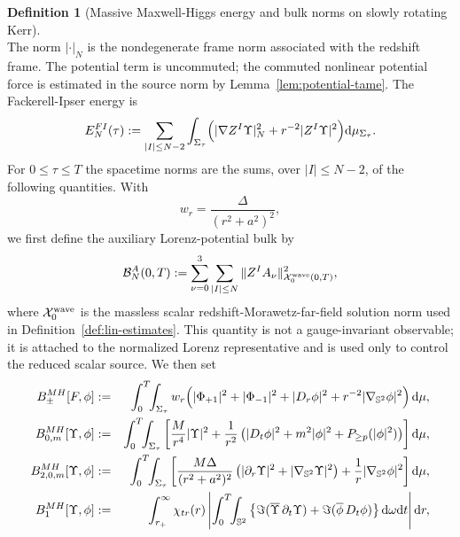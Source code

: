 \documentclass[11pt]{article}
\numberwithin{equation}{section}
\theoremstyle{plain}
\theoremstyle{definition}
\newtheorem{definition}{Definition}[section]
\theoremstyle{remark}
\newcommand{\dd}{\mathrm{d}}
\begin{document}
\begin{definition}[Massive Maxwell-Higgs energy and bulk norms on slowly rotating Kerr]
\begin{equation}
\end{equation}
The norm \(|\cdot|_N\) is the nondegenerate frame norm associated with the redshift frame.  The potential term is uncommuted; the commuted nonlinear potential force is estimated in the source norm by Lemma~\ref{lem:potential-tame}.  The Fackerell-Ipser energy is
\begin{equation}\label{eq:slow-FI-energy-def}
 E_N^{FI}(\tau):=
 \sum_{|I|\le N-2}\int_{\Sigma_\tau}
 \Bigl(|\nabla Z^I\Upsilon|_N^2+r^{-2}|Z^I\Upsilon|^2\Bigr)
 \dd\mu_{\Sigma_\tau}.
\end{equation}
For \(0\le \tau\le T\) the spacetime norms are the sums, over \(|I|\le N-2\), of the following quantities.  With
\begin{equation}
 w_r=\frac{\Delta}{(r^2+a^2)^2},
\end{equation}
we first define the auxiliary Lorenz-potential bulk by
\begin{equation}\label{eq:slow-A-bulk-def}
 \mathcal B_N^A(0,T)
 :=
 \sum_{\nu=0}^{3}\sum_{|I|\le N}
 \|Z^I A_\nu\|_{\mathcal X^{\rm wave}_{0}(0,T)}^2,
\end{equation}
where \(\mathcal X^{\rm wave}_{0}\) is the massless scalar redshift-Morawetz-far-field solution norm used in Definition~\ref{def:lin-estimates}.  This quantity is not a gauge-invariant observable; it is attached to the normalized Lorenz representative and is used only to control the reduced scalar source.  We then set
\begin{eqnarray}
B_{\pm}^{MH}[F,\phi]
&:=&
\int_{0}^{T}\!\!\int_{\Sigma_\tau}
 w_r\Bigl(|\Phi_{+1}|^2+|\Phi_{-1}|^2+|D_r\phi|^2
 +r^{-2}|\nabla_{\mathbb S^2}\phi|^2\Bigr)\,\dd\mu,
\label{eq:slow-Bpm-def}\\
B_{0,m}^{MH}[\Upsilon,\phi]
&:=&
\int_{0}^{T}\!\!\int_{\Sigma_\tau}
\left[
 \frac{M}{r^4}|\Upsilon|^2
 +\frac1{r^2}\left(|D_t\phi|^2+m^2|\phi|^2+P_{\ge p}(|\phi|^2)\right)
\right]\dd\mu,
\label{eq:slow-B0-def}\\
B_{2,0,m}^{MH}[\Upsilon,\phi]
&:=&
\int_{0}^{T}\!\!\int_{\Sigma_\tau}
\left[
 \frac{M\Delta}{(r^2+a^2)^2}\left(|\partial_r\Upsilon|^2
 +|\nabla_{\mathbb S^2}\Upsilon|^2\right)
 +\frac1r|\nabla_{\mathbb S^2}\phi|^2
\right]\dd\mu,
\label{eq:slow-B20-def}\\
B_1^{MH}[\Upsilon,\phi]
&:=&
\int_{r_+}^{\infty}\chi_{tr}(r)
\left|\int_0^T\!\!\int_{\mathbb S^2}
\left\{
 \Im(\overline\Upsilon\,\partial_t\Upsilon)
 +\Im(\overline\phi\,D_t\phi)
\right\}\dd\omega\dd t\right|\dd r,
\label{eq:slow-B1-def}
\end{eqnarray}

\end{definition}
\end{document}
